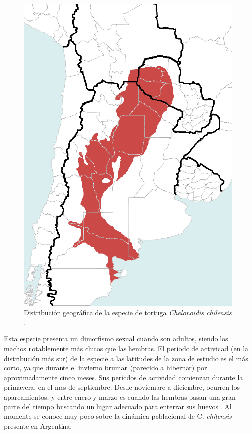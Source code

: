 \begin{figure}[ht]
    \begin{center}
        \includegraphics[width=\imsize]{figs/Chap1/Chelonoidis_chilensis_geographic_range.png}
        \caption{Distribución geográfica de la especie de tortuga \textit{Chelonoidis chilensis}
        \label{fig:distribuciondeEspecie}.}
       
        \end{center}
\end{figure}
Esta especie presenta un dimorfismo sexual cuando son adultos, siendo los machos notablemente más chicos que las hembras. El período de actividad (en la distribución más sur) de la especie a las latitudes de la zona de estudio es el más corto, ya que durante el invierno  bruman (parecido a hibernar) por aproximadamente cinco meses. Sus períodos de actividad comienzan durante la primavera, en el mes de septiembre. Desde noviembre a diciembre, ocurren los apareamientos; y entre enero y marzo es cuando las hembras pasan una gran parte del tiempo buscando un lugar adecuado para enterrar sus huevos \cite{Erika}. Al momento se conoce muy poco sobre la dinámica poblacional de C. \textit{chilensis} presente en Argentina.
 

